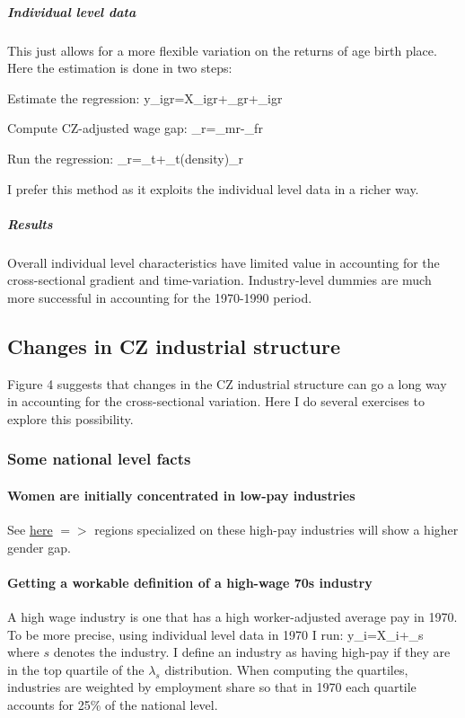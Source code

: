 \subparagraph{Individual level data}
This just allows for a more flexible variation on the returns of age birth place. Here the estimation is done in two steps:
\benu
	\item Estimate the regression:
	\beqn
		y_{igr}=X_{igr}\gamma+\lambda_{gr}+\varepsilon_{igr}
	\eeqn
	\item Compute CZ-adjusted wage gap:
	\beqns
		\tau_r=\lambda_{mr}-\lambda_{fr}
	\eeqns
	\item Run the regression:
	\beqns
	\tau_r=\alpha_t+\beta_t\log(density)_r
	\eeqns
\eenu

I prefer this method as it exploits the individual level data in a richer way.


\subparagraph{Results} 
 Overall individual level characteristics have limited value in accounting for the cross-sectional gradient and time-variation. Industry-level dummies are much more successful in accounting for the 1970-1990 period.


\FloatBarrier

\FloatBarrier




\subsection{Changes in CZ industrial structure}
Figure 4 suggests that changes in the CZ industrial structure can go a long way in accounting for the cross-sectional variation. Here I do several exercises to explore this possibility.

\subsubsection{Some national level facts}
\paragraph{Women are initially concentrated in low-pay industries}
See \href{https://www.dropbox.com/s/lfpo3q5i9mvq8ry/employment_distribution_gender_full_time.png?dl=0}{here} $=> $ regions specialized on these high-pay industries will show a higher gender gap.


\paragraph{Getting a workable definition of a high-wage 70s industry}
A high wage industry is one that has a high worker-adjusted average pay in 1970. To be more precise, using individual level data in 1970 I run:
\beqn
y_{i}=X_{i}\beta+\lambda_{s}
\eeqn
where $s$ denotes the industry.  I define an industry as having high-pay if they are in the top quartile of the $\lambda_{s}$ distribution. When computing the quartiles, industries are weighted by employment share so that in 1970 each quartile accounts for 25\% of the national level.

